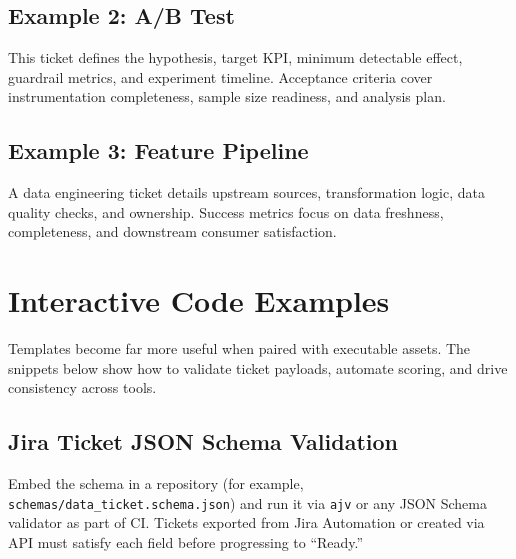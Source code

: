 \subsection{Example 2: A/B Test}
This ticket defines the hypothesis, target KPI, minimum detectable effect, guardrail metrics, and experiment timeline. Acceptance criteria cover instrumentation completeness, sample size readiness, and analysis plan.

\subsection{Example 3: Feature Pipeline}
A data engineering ticket details upstream sources, transformation logic, data quality checks, and ownership. Success metrics focus on data freshness, completeness, and downstream consumer satisfaction.

\section{Interactive Code Examples}
\label{sec:ticket-code-examples}

Templates become far more useful when paired with executable assets. The snippets below show how to validate ticket payloads, automate scoring, and drive consistency across tools.

\subsection{Jira Ticket JSON Schema Validation}
Embed the schema in a repository (for example, \texttt{schemas/data\_ticket.schema.json}) and run it via \texttt{ajv} or any JSON Schema validator as part of CI. Tickets exported from Jira Automation or created via API must satisfy each field before progressing to ``Ready.''


